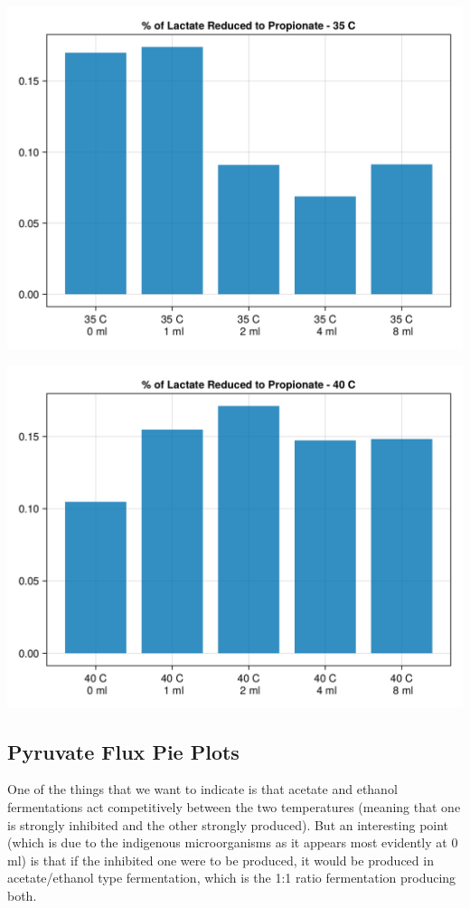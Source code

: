 \documentclass[11pt]{article}
\begin{document}
\begin{center}
\includegraphics[width=.9\linewidth]{../plots/metabolic_results/propionate_flux_35.png}
\end{center}

\begin{center}
\includegraphics[width=.9\linewidth]{../plots/metabolic_results/propionate_flux_40.png}
\end{center}

\subsection{Pyruvate Flux Pie Plots}
\label{sec:org0961f9f}
One of the things that we want to indicate is that acetate and ethanol fermentations act competitively between the two temperatures (meaning that one is strongly inhibited and the other strongly produced). But an interesting point (which is due to the indigenous microorganisms as it appears most evidently at 0 ml) is that if the inhibited one were to be produced, it would be produced in acetate/ethanol type fermentation, which is the 1:1 ratio fermentation producing both.  
\end{document}
